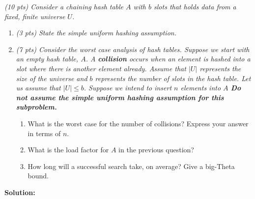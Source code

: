 \documentclass[9pt]{article}
\begin{document}
\vspace{5mm}
\item { \itshape 
	    (10 pts) Consider a chaining hash table $A$ with $b$ slots that holds data from a fixed, finite universe $U$. }
		\begin{enumerate}
		\item {\itshape (3 pts) State the simple uniform hashing assumption. }
		
		\item {\itshape (7 pts) Consider the worst case analysis of hash tables. Suppose we start with an empty hash table, $A$. A \textbf{collision} occurs when an element is hashed into a slot where there is another element already. Assume that $|U|$ represents the size of the universe and $b$ represents the number of slots in the hash table. Let us assume that $|U|\le b$. Suppose we intend to insert $n$ elements into $A$ \textbf{Do not assume the simple uniform hashing assumption for this subproblem.}
		\begin{enumerate}
	      \item What is the worst case for the number of collisions? Express your answer in terms of $n$.
	      \item What is the load factor for $A$ in the previous question?
	      \item How long will a successful search take, on average? Give a big-Theta bound.
	\end{enumerate}}
		
    \end{enumerate}
\textbf{Solution:} \\




\fi
\newpage


\end{document}
